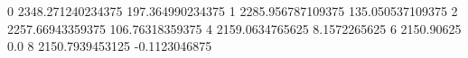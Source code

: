 0 2348.271240234375 197.364990234375
1 2285.956787109375 135.050537109375
2 2257.66943359375 106.76318359375
4 2159.0634765625 8.1572265625
6 2150.90625 0.0
8 2150.7939453125 -0.1123046875
